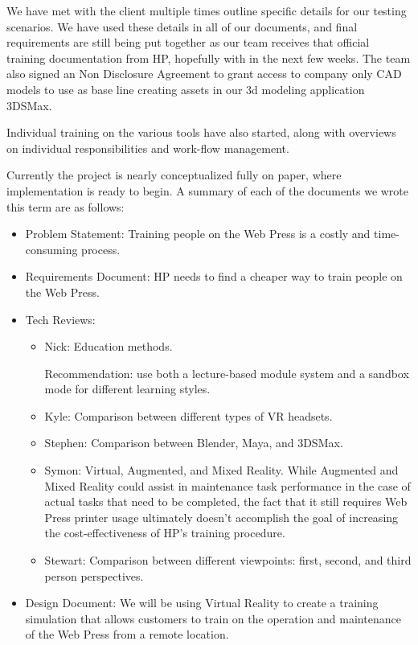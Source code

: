 \documentclass[onecolumn, draftclsnofoot,10pt, compsoc]{IEEEtran}
\begin{document}
We have met with the client multiple times outline specific details for our testing scenarios. We have used these details in all of our documents, and final requirements are still being put together as our team receives that official training documentation from HP, hopefully with in the next few weeks. The team also signed an Non Disclosure Agreement to grant access to company only CAD models to use as base line creating assets in our 3d modeling application 3DSMax. 

Individual training on the various tools have also started, along with overviews on individual responsibilities and work-flow management.

Currently the project is nearly conceptualized fully on paper, where implementation is ready to begin. A summary of each of the documents we wrote this term are as follows:
\begin{itemize}
    \item Problem Statement: Training people on the Web Press is a costly and time-consuming process.
    \item Requirements Document: HP needs to find a cheaper way to train people on the Web Press.
    \item Tech Reviews: 
    \begin{itemize}
        \item Nick: Education methods.
        
        Recommendation: use both a lecture-based module system and a sandbox mode for different learning styles.
        \item Kyle: Comparison between different types of VR headsets.
        \item Stephen: Comparison between Blender, Maya, and 3DSMax.
        \item Symon: Virtual, Augmented, and Mixed Reality. While Augmented and Mixed Reality could assist in maintenance task performance in the case of actual tasks that need to be completed, the fact that it still requires Web Press printer usage ultimately doesn't accomplish the goal of increasing the cost-effectiveness of HP's training procedure.
        \item Stewart: Comparison between different viewpoints: first, second, and third person perspectives.
    \end{itemize}
    \item Design Document: We will be using Virtual Reality to create a training simulation that allows customers to train on the operation and maintenance of the Web Press from a remote location.
\end{itemize}
\end{document}
